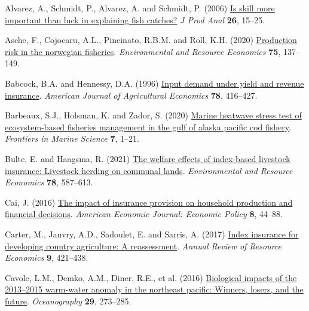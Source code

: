 \documentclass[
  letterpaper,
  DIV=11,
  numbers=noendperiod]{scrartcl}
\newlength{\cslhangindent}
\newenvironment{CSLReferences}[2] %
 {\begin{list}{}{%
  \setlength{\itemindent}{0pt}
  \setlength{\leftmargin}{0pt}
  \setlength{\parsep}{0pt}
  \ifodd #1
   \setlength{\leftmargin}{\cslhangindent}
   \setlength{\itemindent}{-1\cslhangindent}
  \fi
  \setlength{\itemsep}{#2\baselineskip}}}
 {\end{list}}
\theoremstyle{plain}
\theoremstyle{plain}
\theoremstyle{remark}
\begin{document}
\label{refs}
\begin{CSLReferences}{1}{0}
Alvarez, A., Schmidt, P., Alvarez, A. and Schmidt, P. (2006)
\href{https://doi.org/10.1007/s11123-006-0002-x}{Is skill more important
than luck in explaining fish catches?} \emph{J Prod Anal} \textbf{26},
15--25.

Asche, F., Cojocaru, A.L., Pincinato, R.B.M. and Roll, K.H. (2020)
\href{https://doi.org/10.1007/s10640-019-00391-2}{Production risk in the
norwegian fisheries}. \emph{Environmental and Resource Economics}
\textbf{75}, 137--149.

Babcock, B.A. and Hennessy, D.A. (1996)
\href{https://doi.org/10.2307/1243713}{Input demand under yield and
revenue insurance}. \emph{American Journal of Agricultural Economics}
\textbf{78}, 416--427.

Barbeaux, S.J., Holsman, K. and Zador, S. (2020)
\href{https://doi.org/10.3389/fmars.2020.00703}{Marine heatwave stress
test of ecosystem-based fisheries management in the gulf of alaska
pacific cod fishery}. \emph{Frontiers in Marine Science} \textbf{7},
1--21.

Bulte, E. and Haagsma, R. (2021)
\href{https://doi.org/10.1007/s10640-021-00545-1}{The welfare effects of
index-based livestock insurance: Livestock herding on communal lands}.
\emph{Environmental and Resource Economics} \textbf{78}, 587--613.

Cai, J. (2016) \href{https://doi.org/10.1257/pol.20130371}{The impact of
insurance provision on household production and financial decisions}.
\emph{American Economic Journal: Economic Policy} \textbf{8}, 44--88.

Carter, M., Janvry, A.D., Sadoulet, E. and Sarris, A. (2017)
\href{https://doi.org/10.1146/annurev-resource-100516-053352}{Index
insurance for developing country agriculture: A reassessment}.
\emph{Annual Review of Resource Economics} \textbf{9}, 421--438.

Cavole, L.M., Demko, A.M., Diner, R.E., et al. (2016)
\href{https://doi.org/10.5670/oceanog.2016.32}{Biological impacts of the
2013--2015 warm-water anomaly in the northeast pacific: Winners, losers,
and the future}. \emph{Oceanography} \textbf{29}, 273--285.


\end{CSLReferences}
\end{document}
